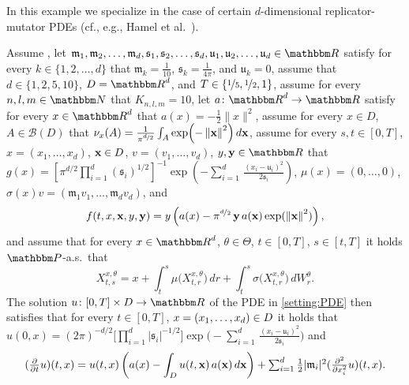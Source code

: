\begin{example}
	\label{exampleMLP:hamel}
	In this example we specialize  in the case of certain $d$-dimensional replicator-mutator PDEs (cf., e.g., Hamel et al.~\cite{Hamel2020}). 

	Assume , let
	$\mathfrak{m}_1, \mathfrak{m}_2, \dots,\mathfrak{m}_d, \mathfrak{s}_1, \mathfrak{s}_2, \dots, \mathfrak{s}_d,\mathfrak{u}_1, \mathfrak{u}_2,\dots,\mathfrak{u}_d \in \R$
	satisfy for every
	$k \in \{1,2,\dots,d\}$
	that
	$\mathfrak{m}_k = \tfrac{1}{10}$,
	$\mathfrak{s}_k = \tfrac{1}{4\pi}$,
	and
	$\mathfrak{u}_k = 0$,
	assume that
	$d\in\{1,2,5,10\}$,
	$\D = \R^{d}$, and
	$T\in\{\nicefrac{1}{5},\nicefrac{1}{2},1\}$,
	assume for every $n,l,m\in \N$
	that 
	$K_{n,l,m} = 10$,
	let
	$a \colon \R^d \to \R$
	satisfy for every
	$x \in \R^d$
	that
	$a(x) = -\frac{1}{2}\|x\|^2$,
	assume for every
	$x \in D$,
	$A \in \mathcal{B}(D)$
	that
	$\nu_x(A) = \frac{1}{\pi^{\nicefrac{d}{2}}}\int_A \exp\!\left(-\left\| \textbf x \right\|^2\right)d{\textbf x}$,
	assume for every
	$s,t \in [0,T]$,
	$
	x = (x_1,\dots,x_d)$,
	${\textbf x} \in D
	$,
	$v= (v_1,\dots,v_d)$,
	$y,{\textbf y} \in \R$
	that
	$g(x)= [\pi^{d/2} \prod_{ i = 1 }^d (\mathfrak{s}_i)^{1/2}]^{-1} \exp (-\sum_{i = 1}^d \, \frac{(x_i - \mathfrak{u}_i )^2}{2\mathfrak{s}_i})$,
	$\mu(x)=(0,\dots,0)$,
	$\sigma(x)v=(\mathfrak{m}_1 v_1, \dots, \mathfrak{m}_d v_d)$, and
	\begin{equation}
		f(t,x,{\textbf x},y,{\textbf y}) =
			y \left(a(x) -  \pi^{\nicefrac{d}{2}} \,{\textbf y} \, a({\textbf x}) \exp(\left\| \textbf x \right\|^2)\right),
	\end{equation}
	and assume that for every 
	$x\in \R^{d}$, 
	$\theta \in \Theta$, 
	$t\in [0,T]$, 
	$s\in [t,T]$ 
	it holds 
	$\P$-a.s.\ that
	\begin{equation}
		X^{x,\theta}_{t,s} 
		= x + \int_{t}^{s} \mu\big(X^{x,\theta}_{t,r}\big) \, dr + \int^{s}_{t} \sigma \big(X^{x,\theta}_{t,r}\big) \, dW^{\theta}_{r} .
		\end{equation}
	The solution $u\colon[0,T]\times \D \to \R$ of the PDE in \eqref{setting:PDE} then satisfies that for every
	$t\in [0,T]$,
	$x = (x_1,\dots,x_d) \in D$
	it holds that
	$u(0,x)= (2\pi)^{-d/2}\big[ \prod_{ i = 1 }^d |\mathfrak{s}_i|^{-1/2}\big] \exp \! \big(-\sum_{i = 1}^d \, \frac{(x_i - \mathfrak{u}_i )^2}{2\mathfrak{s}_i}\big)$ 
	and
	\begin{equation}
		(\tfrac{\partial }{\partial t}u) (t,x) = u(t,x)\left(a(x) - \int_{D} u(t,{\textbf x})\, a({\textbf x}) \, d{\textbf x} \right) + \textstyle\sum_{i=1}^{d} \frac{1}{2} |\mathfrak{m}_i|^2 (\tfrac{\partial^2 }{\partial x_i^2} u) (t,x) .
		\label{eqMLP:aniso_mutator_selector}
	\end{equation}
\end{example}


